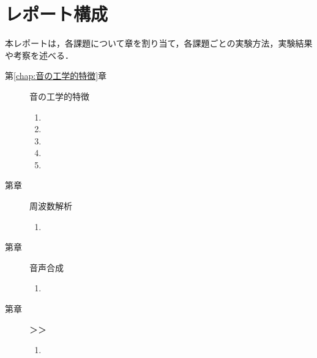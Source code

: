 \section*{レポート構成}
本レポートは，各課題について章を割り当て，各課題ごとの実験方法，実験結果や考察を述べる．\\
\begin{table}[h]
    \begin{minipage}[t]{.48\textwidth}
        \begin{description}
            \item[第\ref{chap:音の工学的特徴}章] 音の工学的特徴
                \begin{enumerate}
                    \item \kadaiaa
                    \item \kadaiab
                    \item \kadaiac
                    \item \kadaiad
                    \item \kadaiae
                \end{enumerate}
            \item[第章] 周波数解析
                \begin{enumerate}
                    \item
                \end{enumerate}
        \end{description}
    \end{minipage}
    \begin{minipage}[t]{.48\textwidth}
        \begin{description}
            \item[第章] 音声合成
                \begin{enumerate}
                    \item
                \end{enumerate}
            \item[第章] ＞＞
                \begin{enumerate}
                    \item
                \end{enumerate}
        \end{description}
    \end{minipage}
\end{table}